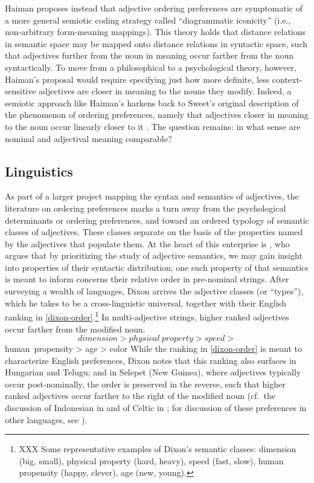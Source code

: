 \documentclass{pnastwo}
\begin{document}
\begin{article}
Haiman \cite{haiman1985} proposes instead that adjective ordering preferences are symptomatic of a more general semiotic coding strategy called ``diagrammatic iconicity'' (i.e., non-arbitrary form-meaning mappings). This theory holds that distance relations in semantic space may be mapped onto distance relations in syntactic space, such that adjectives further from the noun in meaning occur farther from the noun syntactically. To move from a philosophical to a psychological theory, however, Haiman's proposal would require specifying just how more definite, less context-sensitive adjectives are closer in meaning to the nouns they modify. Indeed, a semiotic approach like Haiman's harkens back to Sweet's original description of the phenomenon of ordering preferences, namely that adjectives closer in meaning to the noun occur linearly closer to it \cite{sweet1898}. The question remains: in what sense are nominal and adjectival meaning comparable?

\subsection{Linguistics}
As part of a larger project mapping the syntax and semantics of adjectives, the literature on ordering preferences marks a turn away from the psychological determinants or ordering preferences, and toward an ordered typology of semantic classes of adjectives. These classes separate on the basis of the properties named by the adjectives that populate them. At the heart of this enterprise is \cite{dixon1982}, who argues that by prioritizing the study of adjective semantics, we may gain insight into properties of their syntactic distribution; one such property of that semantics is meant to inform concerns their relative order in pre-nominal strings. After surveying a wealth of languages, Dixon arrives the adjective classes (or ``types''), which he takes to be a cross-linguistic universal, together with their English ranking in \ref{dixon-order}.\footnote{XXX Some representative examples of Dixon's semantic classes: dimension (big, small), physical property (hard, heavy), speed (fast, slow), human propensity (happy, clever), age (new, young).} In multi-adjective strings, higher ranked adjectives occur farther from the modified noun.
\[
dimension > physical\ property > speed > 
\]
\be human\ propensity > age > color\label{dixon-order}\ee
While the ranking in \ref{dixon-order} is meant to characterize English preferences, Dixon notes that this ranking also surfaces in Hungarian and Telugu; and in Selepet (New Guinea), where adjectives typically occur post-nominally, the order is preserved in the reverse, such that higher ranked adjectives occur farther to the right of the modified noun (cf.~the discussion of Indonesian in \cite{martin1969competence} and of Celtic in \cite{sproatshih1991}; for discussion of these preferences in other languages, see \cite{hetzron1978,lapollahuang2004}).


\end{article}
\end{document}
